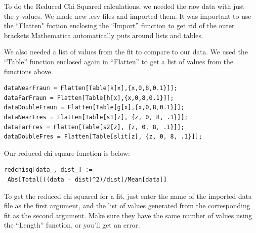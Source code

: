 \documentclass[prb,preprint]{revtex4-1}
\begin{document}
To do the Reduced Chi Squared calculations, we needed the raw data with just the y-values. We made new .csv files and imported them.  It was important to use the ``Flatten" fuction enclosing the ``Import'' function to get rid of the outer brackets Mathematica automatically puts around lists and tables.  

We also needed a list of values from the fit to compare to our data. We used the ``Table'' function enclosed again in ``Flatten'' to get a list of values from the functions above. 

\begin{verbatim}
dataNearFraun = Flatten[Table[k[x],{x,0,8,0.1}]];
dataFarFraun = Flatten[Table[h[x],{x,0,8,0.1}]];
dataDoubleFraun = Flatten[Table[g[x],{x,0,8,0.1}]];
dataNearFres = Flatten[Table[s1[z], {z, 0, 8, .1}]];
dataFarFres = Flatten[Table[s2[z], {z, 0, 8, .1}]];
dataDoubleFres = Flatten[Table[slit[z], {z, 0, 8, .1}]];
\end{verbatim}

Our reduced chi square function is below:

\begin{verbatim}
redchisq[data_, dist_] := 
 Abs[Total[((data - dist)^2)/dist]/Mean[data]]
\end{verbatim}

To get the reduced chi squared for a fit, just enter the name of the imported data file as the first argument, and the list of values generated from the corresponding fit as the second argument. Make sure they have the same number of values using the ``Length'' function, or you'll get an error. 
\end{document}
